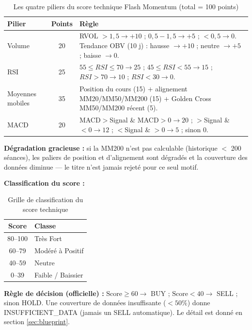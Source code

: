 \documentclass{rapportENSIAS} %
\begin{document}
\begin{table}[H]
\centering
\small
\begin{tabular}{p{3.2cm}cp{8cm}}
\toprule
\textbf{Pilier} & \textbf{Points} & \textbf{Règle} \\
\midrule
Volume & 20 & RVOL $>1{,}5 \rightarrow +10$ ; $0{,}5\!-\!1{,}5 \rightarrow +5$ ; $<0{,}5 \rightarrow 0$. \newline Tendance OBV (10 j) : hausse $\rightarrow +10$ ; neutre $\rightarrow +5$ ; baisse $\rightarrow 0$. \\
RSI & 25 & $55\!\le\!RSI\!\le\!70 \rightarrow 25$ ; $45\!\le\!RSI\!<\!55 \rightarrow 15$ ; $RSI>70 \rightarrow 10$ ; $RSI<30 \rightarrow 0$. \\
Moyennes mobiles & 35 & Position du cours (15) $+$ alignement MM20/MM50/MM200 (15) $+$ Golden Cross MM50/MM200 récent (5). \\
MACD & 20 & MACD$>$Signal \& MACD$>0 \rightarrow 20$ ; $>$Signal \& $<0 \rightarrow 12$ ; $<$Signal \& $>0 \rightarrow 5$ ; sinon $0$. \\
\bottomrule
\end{tabular}
\caption{Les quatre piliers du score technique Flash Momentum (total = 100 points)}
\label{tab:flash-pillars}
\end{table}

\noindent
\textbf{Dégradation gracieuse :} si la MM200 n'est pas calculable (historique $<$ 200 séances), les paliers de position et d'alignement sont dégradés et la couverture des données diminue --- le titre n'est jamais rejeté pour ce seul motif.

\noindent
\textbf{Classification du score :}

\begin{table}[H]
\centering
\small
\begin{tabular}{cl}
\toprule
\textbf{Score} & \textbf{Classe} \\
\midrule
80--100 & Très Fort \\
60--79  & Modéré à Positif \\
40--59  & Neutre \\
0--39   & Faible / Baissier \\
\bottomrule
\end{tabular}
\caption{Grille de classification du score technique}
\label{tab:flash-classification}
\end{table}

\noindent
\textbf{Règle de décision (officielle) :} $\text{Score} \ge 60 \rightarrow$ BUY ; $\text{Score} < 40 \rightarrow$ SELL ; sinon HOLD. Une couverture de données insuffisante ($<50\%$) donne INSUFFICIENT\_DATA (jamais un SELL automatique). Le détail est donné en section \ref{sec:blueprint}.
\end{document}
